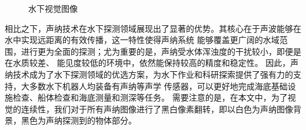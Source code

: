 \begin{figure}[!ht]
  \setlength{\subfigcapskip}{-1bp}
  \centering
  \begin{minipage}{\textwidth}
    \centering
    \hspace{0.5em}
  \end{minipage}
  \caption{水下视觉图像}
  \label{fig:水下视觉图像} %
\end{figure}

相比之下，声纳技术在水下探测领域展现出了显著的优势。其核心在于声波能够在水中实现远距离的有效传播，这一特性使得声纳系统
能够覆盖更广阔的水域范围，进行更为全面的探测；尤为重要的是，声纳受水体浑浊度的干扰较小，即便是在水质较差、
能见度较低的环境中，依然能保持较高的精度和稳定性。
因此，声纳技术成为了水下探测领域的优选方案，为水下作业和科研探索提供了强有力的支持，大多数水下机器人均装备有声纳等声学
传感器，可以更好地完成海底基础设施检查、船体检查\cite{kaess2010towards}和海底测量和测深\cite{fallon2011efficient}等任务。
需要注意的是，在本文中，为了视觉的连续性，我们对于所有声纳图像进行了黑白像素翻转，即以白色为声纳图像背景，黑色为声纳探测到的物体部分。

